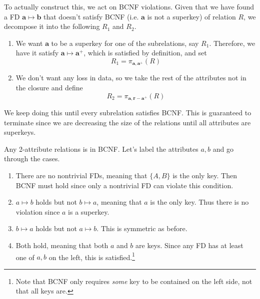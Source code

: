 \documentclass{article}
\begin{document}
    \begin{algo}
      To actually construct this, we act on BCNF violations. Given that we have found a FD $\mathbf{a} \mapsto \mathbf{b}$ that doesn't satisfy BCNF (i.e. $\mathbf{a}$ is not a superkey) of relation $R$, we decompose it into the following $R_1$ and $R_2$. 
      \begin{enumerate}
        \item We want $\mathbf{a}$ to be a superkey for one of the subrelations, say $R_1$. Therefore, we have it satisfy $\mathbf{a} \mapsto \mathbf{a}^+$, which is satisfied by definition, and set 
          \begin{equation}
            R_1 = \pi_{\mathbf{a}, \mathbf{a}^+} (R)
          \end{equation}
        \item We don't want any loss in data, so we take the rest of the attributes not in the closure and define  
          \begin{equation}
            R_2 = \pi_{\mathbf{a}, \mathbf{r} - \mathbf{a}^+} (R)
          \end{equation}
      \end{enumerate}
      We keep doing this until every subrelation satisfies BCNF. This is guaranteed to terminate since we are decreasing the size of the relations until all attributes are superkeys.  
    \end{algo}

    \begin{theorem}
      Any 2-attribute relations is in BCNF. Let's label the attributes $a, b$ and go through the cases. 
      \begin{enumerate}
        \item There are no nontrivial FDs, meaning that $\{A, B\}$ is the only key. Then BCNF must hold since only a nontrivial FD can violate this condition. 
        \item $a \mapsto b$ holds but not $b \mapsto a$, meaning that $a$ is the only key. Thus there is no violation since $a$ is a superkey. 
        \item $b \mapsto a$ holds but not $a \mapsto b$. This is symmetric as before. 
        \item Both hold, meaning that both $a$ and $b$ are keys. Since any FD has at least one of $a, b$ on the left, this is satisfied.\footnote{Note that BCNF only requires \textit{some} key to be contained on the left side, not that all keys are. } 
      \end{enumerate}
    \end{theorem}
\end{document}
